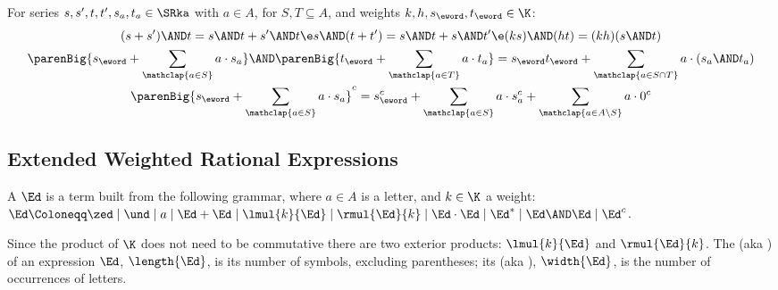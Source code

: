 \documentclass[a4paper,USenglish]{lipics}
\begin{document}
\begin{Proposition}
  \label{prop:series}
  For series $s, s', t, t', s_a, t_a \in \SRka$ with $a \in A$, for
  $S, T\subseteq A$, and weights $k, h, s_{\eword}, t_{\eword} \in \K$:
  \begin{gather}
    \label{eq:series:and:distrib}
    (s+s') \AND t = s\AND t + s'\AND t
    \e
    s \AND (t+t') = s\AND t + s\AND t'
    \e
    (ks) \AND (ht) = (kh) (s\AND t)
    \\
    \label{eq:series:and:zip}
    \parenBig{s_{\eword} + \sum_{\mathclap{a\in S}} a\cdot s_a}
    \AND
    \parenBig{t_{\eword} + \sum_{\mathclap{a\in T}} a\cdot t_a}
    = s_{\eword}t_{\eword} + \sum_{\mathclap{a\in S \cap T}} a\cdot(s_a \AND t_a)
    \\
    \label{eq:series:compl}
    \parenBig{s_{\eword} + \sum_{\mathclap{a\in S}} a\cdot s_a}^{c}
    = s_{\eword}^{c} + \sum_{\mathclap{a\in S}} a\cdot s_a^{c} + \sum_{\mathclap{a\in A\setminus S}} a\cdot 0^{c}
  \end{gather}
\end{Proposition}

\subsection{Extended Weighted Rational Expressions}
\label{sec:expr}
\begin{Definition}
  A  $\Ed$ is a term built from the
  following grammar, where $a \in A$ is a letter, and $k \in \K$ a weight:
  \begin{math}
    \Ed \Coloneqq \zed
          \mid \und
          \mid a
          \mid \Ed + \Ed
          \mid \lmul{k}{\Ed}
          \mid \rmul{\Ed}{k}
          \mid \Ed \cdot \Ed
          \mid \Ed^*
          \mid \Ed \AND \Ed
          \mid \Ed^c
  \end{math}.
\end{Definition}

Since the product of $\K$ does not need to be commutative there are two
exterior products: $\lmul{k}{\Ed}$ and $\rmul{\Ed}{k}$.
The  (aka ) of an expression $\Ed$, $\length{\Ed}$, is
its number of symbols, excluding parentheses; its  (aka
), $\width{\Ed}$, is the number of occurrences of
letters.
\end{document}
